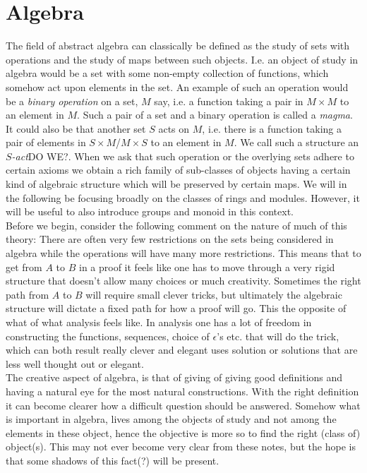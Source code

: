\section{Algebra}
The field of abstract algebra can classically be defined as the study of sets with operations and the study of maps between such objects. I.e. an object of study in algebra would be a set with some non-empty collection of functions, which somehow act upon elements in the set. An example of such an operation would be a \textit{binary operation} on a set, $M$ say, i.e. a function taking a pair in $M\times M$ to an element in $M$. Such a pair of a set and a binary operation is called a \textit{magma}. It could also be that another set $S$ acts on $M$, i.e. there is a function taking a pair of elements in $S\times M$/$M\times S$ to an element in $M$. We call such a structure an \textit{$S$-act}{\LARGE DO WE?}. When we ask that such operation or the overlying sets adhere to certain axioms we obtain a rich family of sub-classes of objects having a certain kind of algebraic structure which will be preserved by certain maps. We will in the following be focusing broadly on the classes of rings and modules. However, it will be useful to also introduce groups and monoid in this context.\\ Before we begin, consider the following comment on the nature of much of this theory: There are often very few restrictions on the sets being considered in algebra while the operations will have many more restrictions. This means that to get from $A$ to $B$ in a proof it feels like one has to move through a very rigid structure that doesn't allow many choices or much creativity. Sometimes the right path from $A$ to $B$ will require small clever tricks, but ultimately the algebraic structure will dictate a fixed path for how a proof will go. This the opposite of what of what analysis feels like. In analysis one has a lot of freedom in constructing the functions, sequences, choice of $\epsilon$'s etc. that will do the trick, which can both result really clever and elegant uses solution or solutions that are less well thought out or elegant.\\
The creative aspect of algebra, is that of giving of giving good definitions and having a natural eye for the most natural constructions. With the right definition it can become clearer how a difficult question should be answered. Somehow what is important in algebra, lives among the objects of study and not among the elements in these object, hence the objective is more so to find the right (class of) object(s). This may not ever become very clear from these notes, but the hope is that some shadows of this fact(?) will be present.         

